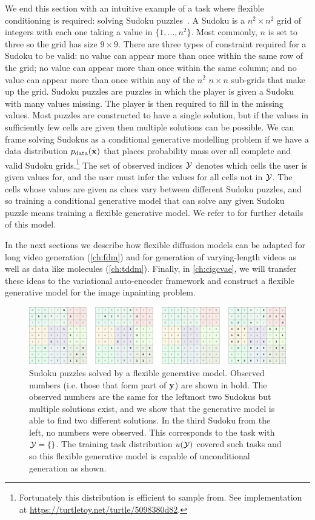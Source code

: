 We end this section with an intuitive example of a task where flexible conditioning is required: solving Sudoku puzzles~\citep{weilbach2023graphically}. A Sudoku is a $n^2 \times n^2$ grid of integers with each one taking a value in $\{1,\ldots,n^2\}$. Most commonly, $n$ is set to three so the grid has size $9 \times 9$. There are three types of constraint required for a Sudoku to be valid: no value can appear more than once within the same row of the grid; no value can appear more than once within the same column; and no value can appear more than once within any of the $n^2$ $n \times n$ sub-grids that make up the grid. Sudoku puzzles are puzzles in which the player is given a Sudoku with many values missing. The player is then required to fill in the missing values. Most puzzles are constructed to have a single solution, but if the values in sufficiently few cells are given then multiple solutions can be possible. We can frame solving Sudokus as a conditional generative modelling problem if we have a data distribution $p_{\rm{data}}({\mathbf{x}})$ that places probability mass over all complete and valid Sudoku grids.\footnote{Fortunately this distribution is efficient to sample from. See implementation at \url{https://turtletoy.net/turtle/5098380d82}.} The set of observed indices ${\mathcal{Y}}$ denotes which cells the user is given values for, and the user must infer the values for all cells not in ${\mathcal{Y}}$. The cells whose values are given as clues vary between different Sudoku puzzles, and so training a conditional generative model that can solve any given Sudoku puzzle means training a flexible generative model. We refer to \citet{weilbach2023graphically} for further details of this model.

In the next sections we describe how flexible diffusion models can be adapted for long video generation (\cref{ch:fdm}) and for generation of varying-length videos as well as data like molecules (\cref{ch:tddm}). Finally, in \cref{ch:cigcvae}, we will transfer these ideas to the variational auto-encoder framework and construct a  flexible generative model for the image inpainting problem.

\begin{figure}
    \centering
    \includegraphics[width=\textwidth]{figs/thesis/sudoku_panel.pdf}
    \caption{Sudoku puzzles solved by a flexible generative model. Observed numbers (i.e. those that form part of ${\mathbf{y}}$) are shown in bold. The observed numbers are the same for the leftmost two Sudokus but multiple solutions exist, and we show that the generative model is able to find two different solutions. In the third Sudoku from the left, no numbers were observed. This corresponds to the task with ${\mathcal{Y}} = \{\}$. The training task distribution $u({\mathcal{Y}})$ covered such tasks and so this flexible generative model is capable of unconditional generation as shown. }
    \label{fig:sudoku-panel}
\end{figure}